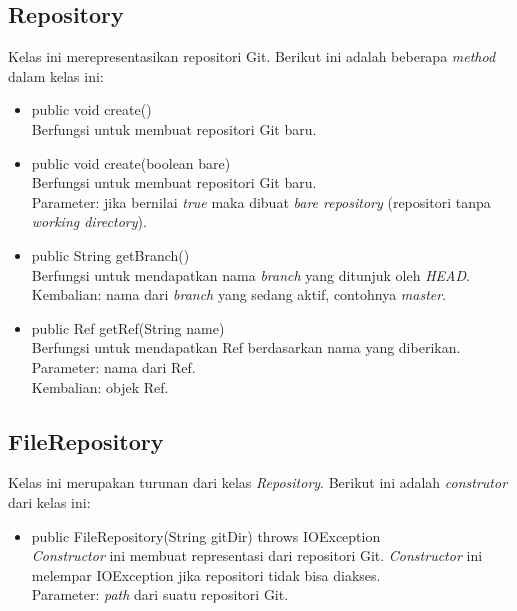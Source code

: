 \subsection{Repository}
\label{subsec:repository}
Kelas ini merepresentasikan repositori Git. Berikut ini adalah beberapa \textit{method} dalam kelas ini:
\begin{itemize}
\item public void create()\\
Berfungsi untuk membuat repositori Git baru.
\item public void create(boolean bare)\\
Berfungsi untuk membuat repositori Git baru. \\
Parameter: jika bernilai \textit{true} maka dibuat \textit{bare repository} (repositori tanpa \textit{working directory}). 
\item public String getBranch()\\
Berfungsi untuk mendapatkan nama \textit{branch} yang ditunjuk oleh \textit{HEAD}.\\
Kembalian: nama dari \textit{branch} yang sedang aktif, contohnya \textit{master}.
\item public Ref getRef(String name)\\
Berfungsi untuk mendapatkan Ref berdasarkan nama yang diberikan.\\
Parameter: nama dari Ref.\\
Kembalian: objek Ref.
\end{itemize} 

\subsection{FileRepository}
\label{subsec:filerepository}
Kelas ini merupakan turunan dari kelas \textit{Repository}. Berikut ini adalah \textit{construtor} dari kelas ini:
\begin{itemize}
\item public FileRepository(String gitDir) throws IOException\\
\textit{Constructor} ini membuat representasi dari repositori Git. \textit{Constructor} ini melempar IOException jika repositori tidak bisa diakses.\\
Parameter: \textit{path} dari suatu repositori Git.
\end{itemize}

